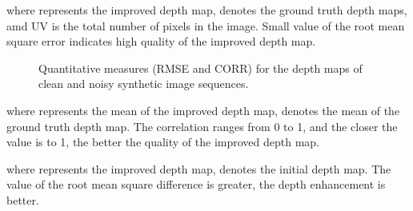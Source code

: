 \documentclass[a4paper,fleqn]{cas-dc}
\begin{document}
where  represents the improved depth map,  denotes the ground truth depth maps, amd UV is the total number of pixels in the image. Small value of the root mean
square error indicates high quality of the improved depth map.

\begin{figure*}[htp]
	\centering
{}
	\hspace{1in}
	\hspace{1in}
\caption{Quantitative measures (RMSE and CORR) for the depth maps of clean and noisy synthetic image sequences.}
	\label{fig:QM_synthetic}
	\vspace*{-0.4cm}
\end{figure*}


where  represents the mean of the improved depth map,  denotes the mean of the ground truth depth map. The correlation ranges from 0 to 1, and the closer the value is to 1, the better the quality of the improved depth map.

where  represents the improved depth map,  denotes the initial depth map. The value of the root mean square difference is greater, the depth enhancement is better.
\end{document}
